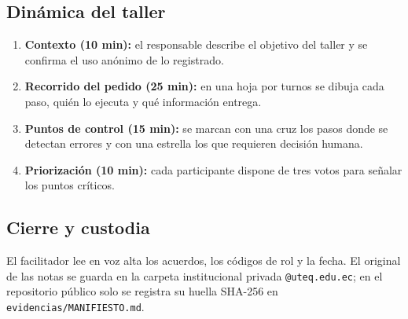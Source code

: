 \subsection*{Din\'amica del taller}
\begin{enumerate}[leftmargin=18pt,itemsep=0pt]
    \item \textbf{Contexto (10 min):} el responsable describe el objetivo del taller y se confirma el uso an\'onimo de lo registrado.
    \item \textbf{Recorrido del pedido (25 min):} en una hoja por turnos se dibuja cada paso, qui\'en lo ejecuta y qu\'e informaci\'on entrega.
    \item \textbf{Puntos de control (15 min):} se marcan con una cruz los pasos donde se detectan errores y con una estrella los que requieren decisi\'on humana.
    \item \textbf{Priorizaci\'on (10 min):} cada participante dispone de tres votos para señalar los puntos cr\'iticos.
\end{enumerate}

\subsection*{Cierre y custodia}
El facilitador lee en voz alta los acuerdos, los códigos de rol y la fecha. El original de las notas se guarda en la carpeta institucional privada \texttt{@uteq.edu.ec}; en el repositorio p\'ublico solo se registra su huella SHA-256 en \texttt{evidencias/MANIFIESTO.md}.
